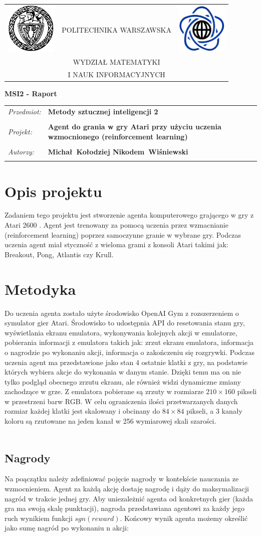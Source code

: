 \documentclass[12pt]{article}
\renewcommand{\maketitle}{
\begin{titlepage}
\begin{table}[t]
\centering
\begin{tabular}[t]{lcr}
 \includegraphics[width=70pt,height=70pt]{PW} & POLITECHNIKA WARSZAWSKA & \includegraphics[width=70pt,height=70pt]{MiNI}\\
& WYDZIAŁ MATEMATYKI & \\
& I NAUK INFORMACYJNYCH &
\end{tabular}
\end{table}
\vspace*{3cm}
  \begin{center}
    \LARGE
    \textbf {MSI2 - Raport}\\
   \vspace*{2 cm}
\begin{table}[!htp]
\begin{tabular}{p{4cm}p{9cm}}
\textit{Przedmiot:} &\textbf {Metody sztucznej inteligencji 2} \\
\\
\textit{Projekt:} &\textbf {Agent do grania w gry Atari przy użyciu uczenia wzmocnionego (reinforcement learning)} \\
\\
\textit{Autorzy:} &\textbf {Michał~Kołodziej \newline Nikodem~Wiśniewski} \\
\\
\end{tabular}
\end{table}

\vspace{5 cm}
  \center{\small Warszawa, dnia \today}
\end{center}
\end{titlepage}
}
\begin{document}
\maketitle


\section{Opis projektu}
Zadaniem tego projektu jest stworzenie agenta komputerowego grającego w gry z Atari 2600 \cite{atari}. Agent jest trenowany za pomocą uczenia przez wzmacnianie (reinforcement learning) poprzez samoczynne granie w wybrane gry. Podczas uczenia agent miał styczność z wieloma grami z konsoli Atari takimi jak: Breakout, Pong, Atlantis czy Krull.

\section{Metodyka}

Do uczenia agenta zostało użyte środowisko OpenAI Gym \cite{gym} z rozszerzeniem o symulator gier Atari. Środowisko to udostępnia API do resetowania stanu gry, wyświetlania ekranu emulatora, wykonywania kolejnych akcji w emulatorze, pobierania informacji z emulatora takich jak: zrzut ekranu emulatora, informacja o nagrodzie po wykonaniu akcji, informacja o zakończeniu się rozgrywki. Podczas uczenia agent ma przedstawione jako stan 4 ostatnie klatki z gry, na podstawie których wybiera akcje do wykonania w danym stanie. Dzięki temu ma on nie tylko podgląd obecnego zrzutu ekranu, ale również widzi dynamiczne zmiany zachodzące w grze. Z emulatora pobierane są zrzuty w rozmiarze $210\times160$ pikseli w przestrzeni barw RGB. W celu ograniczenia ilości przetwarzanych danych rozmiar każdej klatki jest skalowany i obcinany do $84\times84$ pikseli, a 3 kanały koloru są rzutowane na jeden kanał w 256 wymiarowej skali szarości.
\\\

\subsection{Nagrody}

Na poączątku należy zdefiniować pojęcie nagrody w kontekście nauczania ze wzmocnieniem. Agent za każdą akcję dostaję nagrodę i dąży do maksymalizacji nagród w trakcie jednej gry. Aby uniezależnić agenta od konkretnych gier (każda gra ma swoją skalę punktacji), nagroda przedstawiana agentowi za każdy jego ruch wynikiem funkcji $sgn(reward)$. Końcowy wynik agenta możemy określić jako sumę nagród po wykonaniu n akcji:
\end{document}
